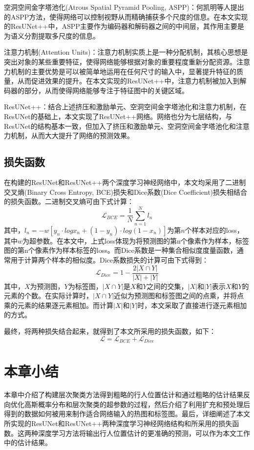空洞空间金字塔池化(Atrous Spatial Pyramid Pooling, ASPP)：何凯明等人\cite{2014Spatial}提出的ASPP方法，使得网络可以控制视野从而精确捕获多个尺度的信息。在本文实现的ResUNet++中，ASPP主要作为编码器和解码器之间的中间层，其作用主要是为语义分割提取多尺度的信息。

注意力机制(Attention Units)：注意力机制实质上是一种分配机制，其核心思想是突出对象的某些重要特征，使得网络能够根据对象的重要程度重新分配资源。注意力机制的主要优势是可以被简单地运用在任何尺寸的输入中，显著提升特征的质量，从而促进效果的提升。在本文实现的ResUNet++中，注意力机制被加入到解码器的部分，从而使得网络能够专注于特征图中的关键区域。

ResUNet++：结合上述挤压和激励单元、空洞空间金字塔池化和注意力机制，在ResUNet的基础上，本文实现了ResUNet++网络。网络也分为七层结构，与ResUNet的结构基本一致，但加入了挤压和激励单元、空洞空间金字塔池化和注意力机制，从而大大提升了网络的预测效果。

\subsection{损失函数}

在构建的ResUNet和ResUNet++两个深度学习神经网络中，本文均采用了二进制交叉熵(Binary Cross Entropy, BCE)损失和Dice系数(Dice Coefficient)损失相结合的损失函数。二进制交叉熵可由下式计算：
\begin{equation}
  \mathcal{L}_{BCE} = \frac{1}{N}\sum_{n=1}^{N}l_{n}
\end{equation}
其中，$l_n=-w[y_n \cdot log{x_n}+(1-y_n) \cdot log(1-x_n)]$为第$n$个样本对应的loss，其中$w$为超参数。在本文中，上式loss体现为将预测图的第n个像素作为样本，标签图的第n个像素作为样本标签的loss。而Dice系数是一种集合相似度度量函数，通常用于计算两个样本的相似度。Dice系数损失的计算可由下式得到：
\begin{equation}
  \mathcal{L}_{Dice} = 1-\frac{2|X \cap Y|}{|X|+|Y|}
\end{equation}
其中，$X$为预测图，$Y$为标签图，$|X \cap Y|$是$X$和$Y$之间的交集，$|X|$和$|Y|$表示$X$和$Y$的元素的个数。在实际计算时，$|X \cap Y|$近似为预测图和标签图之间的点乘，并将点乘的元素的结果逐元素相加。而计算$|X|$和$|Y|$时，本文采取了直接进行逐元素相加的方式。

最终，将两种损失结合起来，就得到了本文所采用的损失函数，如下：
\begin{equation}
  \mathcal{L} = \mathcal{L}_{BCE} + \mathcal{L}_{Dice}
\end{equation}

\section{本章小结}

本章中介绍了构建层次聚类方法得到粗略的行人位置估计和通过粗略的估计结果反向优化高斯概率分布和层次聚类的超参数的过程，然后介绍了利用扩充和预处理后得到的数据如何被用来制作适合网络输入的热图和标签图。最后，详细阐述了本文所实现的ResUNet和ResUNet++两种深度学习神经网络结构和所采用的损失函数。这两种深度学习方法将输出行人位置估计的更准确的预测，可以作为本文工作中的估计结果。